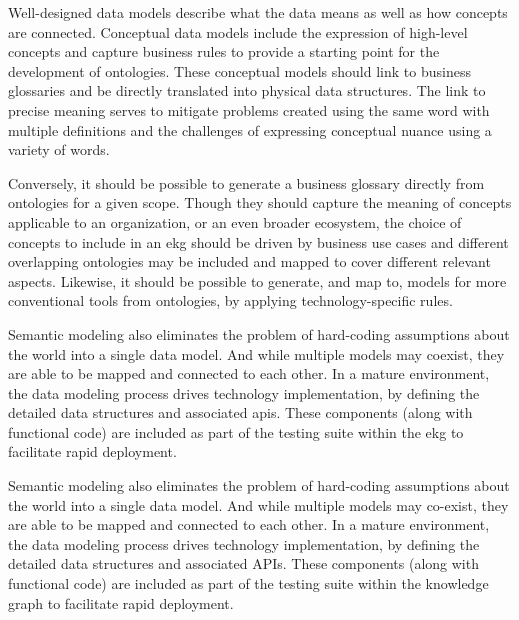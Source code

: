 %
%

\ekgmmCapabilitySectionContributionToEnterprise

Well-designed data models describe what the data means as well as how concepts are connected.
Conceptual data models include the expression of high-level concepts and capture business rules to provide a starting
point for the development of ontologies.
These conceptual models should link to business glossaries and be directly translated into physical data structures.
The link to precise meaning serves to mitigate problems created using the same word with multiple definitions and
the challenges of expressing conceptual nuance using a variety of words.

Conversely, it should be possible to generate a business glossary directly from ontologies for a given scope.
Though they should capture the meaning of concepts applicable to an organization, or an even broader ecosystem,
the choice of concepts to include in an \gls{ekg} should be driven by business use cases and different
overlapping ontologies may be included and mapped to cover different relevant aspects.
Likewise, it should be possible to generate, and map to, models for more conventional tools from ontologies,
by applying technology-specific rules.

Semantic modeling also eliminates the problem of hard-coding assumptions about the world into a single data model.
And while multiple models may coexist, they are able to be mapped and connected to each other.
In a mature environment, the data modeling process drives technology implementation,
by defining the detailed data structures and associated \glspl{api}.
These components (along with functional code) are included as part of the testing suite within the \gls{ekg}
to facilitate rapid deployment.

Semantic modeling also eliminates the problem of hard-coding assumptions about the world into a single data model.
And while multiple models may co-exist, they are able to be mapped and connected to each other.
In a mature environment, the data modeling process drives technology implementation, by defining the detailed
data structures and associated APIs.
These components (along with functional code) are included as part of the testing suite within the knowledge graph
to facilitate rapid deployment.

\ekgmmCapabilitySectionDimensions

